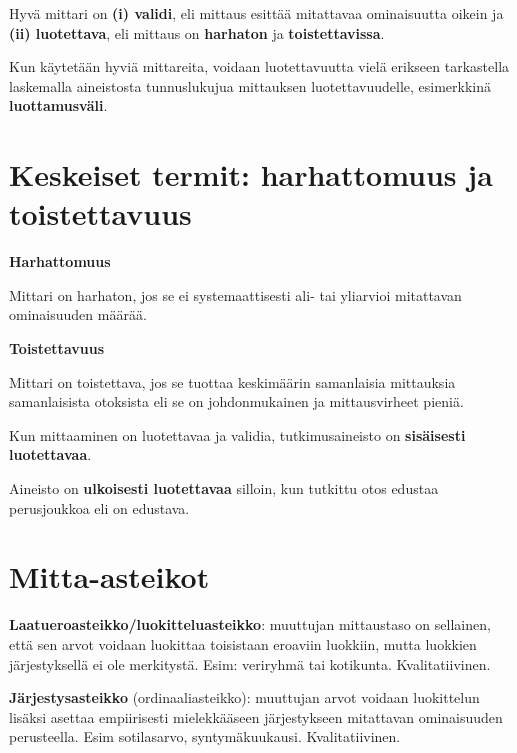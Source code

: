 \documentclass[
]{report}
\begin{document}
Hyvä mittari on \textbf{(i) validi}, eli mittaus esittää mitattavaa
ominaisuutta oikein ja \textbf{(ii) luotettava}, eli mittaus on
\textbf{harhaton} ja \textbf{toistettavissa}.

Kun käytetään hyviä mittareita, voidaan luotettavuutta vielä erikseen
tarkastella laskemalla aineistosta tunnuslukujua mittauksen
luotettavuudelle, esimerkkinä \textbf{luottamusväli}.

\hypertarget{keskeiset-termit-harhattomuus-ja-toistettavuus}{%
\section{Keskeiset termit: harhattomuus ja
toistettavuus}\label{keskeiset-termit-harhattomuus-ja-toistettavuus}}

\begin{defblock}{}
\textbf{Harhattomuus}

Mittari on harhaton, jos se ei systemaattisesti ali- tai yliarvioi
mitattavan ominaisuuden määrää.

\end{defblock}

\begin{defblock}{}
\textbf{Toistettavuus}

Mittari on toistettava, jos se tuottaa keskimäärin samanlaisia
mittauksia samanlaisista otoksista eli se on johdonmukainen ja
mittausvirheet pieniä.

\end{defblock}

Kun mittaaminen on luotettavaa ja validia, tutkimusaineisto on
\textbf{sisäisesti luotettavaa}.

Aineisto on \textbf{ulkoisesti luotettavaa} silloin, kun tutkittu otos
edustaa perusjoukkoa eli on edustava.

\hypertarget{mitta-asteikot}{%
\section{Mitta-asteikot}\label{mitta-asteikot}}

\textbf{Laatueroasteikko/luokitteluasteikko}: muuttujan mittaustaso on
sellainen, että sen arvot voidaan luokittaa toisistaan eroaviin
luokkiin, mutta luokkien järjestyksellä ei ole merkitystä. Esim:
veriryhmä tai kotikunta. Kvalitatiivinen.

\textbf{Järjestysasteikko} (ordinaaliasteikko): muuttujan arvot voidaan
luokittelun lisäksi asettaa empiirisesti mielekkääseen järjestykseen
mitattavan ominaisuuden perusteella. Esim sotilasarvo, syntymäkuukausi.
Kvalitatiivinen.
\end{document}
